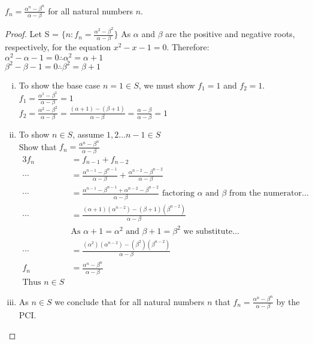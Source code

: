 \documentclass[a4paper,11pt]{article}
\begin{document}
\begin{theorem1}
\(f_n=\frac{\alpha^n-\beta^n}{\alpha - \beta}\) for all natural numbers \(n\).
 \begin{proof}
Let S = \(\{n : f_n= \frac{\alpha^2-\beta^2}{\alpha - \beta}\}\)
As \(\alpha\) and \(\beta\) are the positive and negative roots, respectively, for 
the equation \(x^2-x-1=0\). Therefore:\\
\(\alpha^2-\alpha-1=0 \therefore \alpha^2=\alpha+1\)\\
\(\beta^2-\beta-1=0 \therefore \beta^2=\beta+1\)
\begin{enumerate}[(i)]   
 \item To show the base case \(n=1 \in S\), we must show \(f_1=1\) and \(f_2=1\).\\
 \(f_1 = \frac{\alpha^1-\beta^1}{\alpha-\beta} = 1\)\\
 \(f_2 = \frac{\alpha^2 - \beta^2}{\alpha-\beta} = \frac{{(\alpha+1)} - {(\beta+1)}}{\alpha-\beta} = \frac{\alpha - \beta}{\alpha-\beta} = 1\)
 \newpage
 \item To show \(n \in S\), assume \(1, 2 \ldots n-1 \in S\)\\
 Show that \(f_{n} = \frac{\alpha^n-\beta^n}{\alpha - \beta}\)
 \begin{alignat*}{3}
   f_n &= f_{n-1}+f_{n-2}\\
   \cdots &= \frac{\alpha^{n-1}-\beta^{n-1}}{\alpha - \beta} + \frac{\alpha^{n-2}-\beta^{n-2}}{\alpha - 
   \beta}\\
   \cdots &= \frac{\alpha^{n-1}-\beta^{n-1} + \alpha^{n-2}-\beta^{n-2}}{\alpha - 
   \beta}\text{ factoring }\alpha \text{ and }\beta \text{ from the numerator}\ldots\\
   \cdots &= \frac{{(\alpha + 1){(\alpha^{n-2})}}-{(\beta + 1)}{(\beta^{n-2})}}{\alpha - 
   \beta}\\
   &\text{As }\alpha+1 = \alpha^2 \text{ and }\beta+1 = \beta^2 \text{ we 
   substitute}\ldots\\
   \cdots &= \frac{{(\alpha^2){(\alpha^{n-2})}}-{(\beta^2)}{(\beta^{n-2})}}{\alpha - 
   \beta}\\
   f_n &= \frac{\alpha^n-\beta^n}{\alpha - \beta}\\
   \text{Thus } n \in S
 \end{alignat*}
 \item As \(n \in S\) we conclude that for all natural numbers \(n\) that \(f_n=\frac{\alpha^n-\beta^n}{\alpha - 
 \beta}\) by the PCI.
\end{enumerate}
\end{proof}  
\end{theorem1}
\newpage
\end{document}
